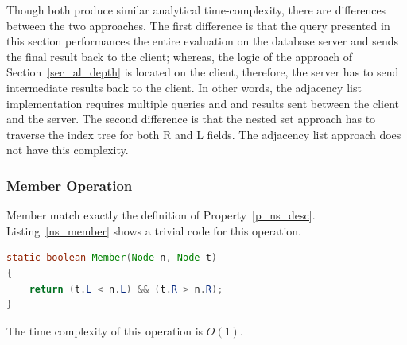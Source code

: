Though both produce similar analytical time-complexity, there are differences between the two approaches. The first difference is that the query presented in this section performances the entire evaluation on the database server and sends the final result back to the client; whereas, the logic of the approach of Section~\ref{sec_al_depth} is located on the client, therefore, the server has to send intermediate results back to the client. In other words, the adjacency list implementation requires multiple queries and and results sent between the client and the server. The second difference is that the nested set approach has to traverse the index tree for both R and L fields. The adjacency list approach does not have this complexity.





\subsubsection{Member Operation}

Member match exactly the definition of Property~\ref{p_ns_desc}. Listing~\ref{ns_member} shows a trivial code for this operation.

\begin{lstlisting}[language=java,style=java,caption={Member Operation},label=ns_member]
static boolean Member(Node n, Node t)
{
    return (t.L < n.L) && (t.R > n.R);
}
\end{lstlisting}

The time complexity of this operation is $O(1)$.

